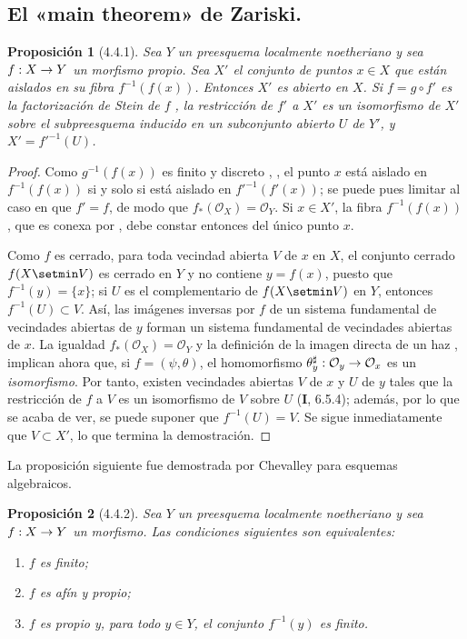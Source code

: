 \documentclass[10pt,oneside,openany]{book}
\theoremstyle{egaenv}\newtheorem*{env}{---}
\theoremstyle{egastatement}
\newtheorem*{proposition}{Proposición}
\theoremstyle{egadescription}
\newcommand{\oldpage}[2][]{\marginnote{\normalfont\scriptsize\textbf{#1}\,|\,#2}\ignorespaces}
\renewcommand{\to}{\mathchoice{\longrightarrow}{\rightarrow}{\rightarrow}{\rightarrow}}
\begin{document}
\subsection{El «main theorem» de Zariski.}
\label{subsection:III.4.4-fr}

\begin{proposition}[4.4.1]
\label{III.4.4.1}
\label{III.4.4.1-fr}
Sea $Y$ un preesquema localmente noetheriano y sea $f:X\to Y$ un
morfismo propio. Sea $X'$ el conjunto de puntos $x\in X$ que están
aislados en su fibra $f^{-1}(f(x))$. Entonces $X'$ es abierto en $X$.
Si
$f=g\circ f'$
es la factorización de Stein de $f$ , la restricción
de $f'$ a $X'$ es un isomorfismo de $X'$ sobre el subpreesquema inducido
en un subconjunto abierto $U$ de $Y'$, y
$X'=f'^{-1}(U)$.
\end{proposition}

\begin{proof}
Como $g^{-1}(f(x))$ es finito y discreto
, , el punto $x$ está aislado en
$f^{-1}(f(x))$ si y solo si está aislado en
$f'^{-1}(f'(x))$; se puede pues limitar al caso en que $f'=f$, de
modo que $f_*(\mathcal O_X)=\mathcal O_Y$. Si $x\in X'$, la fibra
$f^{-1}(f(x))$, que es conexa por , debe constar
entonces del único punto $x$.

Como $f$ es cerrado, para toda vecindad abierta $V$ de $x$ en $X$, el
conjunto cerrado $f(X\setmin V)$ es cerrado en $Y$ y no contiene
$y=f(x)$, puesto que $f^{-1}(y)=\{x\}$; si $U$ es el complementario de
$f(X\setmin V)$ en $Y$, entonces $f^{-1}(U)\subset V$. Así, las
imágenes inversas por $f$ de un sistema fundamental de vecindades
abiertas de $y$ forman un sistema fundamental de vecindades abiertas de
$x$. La igualdad $f_*(\mathcal O_X)=\mathcal O_Y$ y la definición de la
imagen directa de un haz ,  implican
ahora que, si $f=(\psi,\theta)$, el homomorfismo
$\theta_y^\sharp:\mathcal O_y\to\mathcal O_x$
es un \emph{isomorfismo}. Por tanto, existen vecindades abiertas $V$ de $x$ y
$U$ de $y$ tales que la restricción de $f$ a $V$ es un isomorfismo de $V$ sobre
$U$ (\textbf{I}, 6.5.4); además, por lo que se acaba de ver,
\oldpage[III]{136}
se puede suponer que $f^{-1}(U)=V$. Se sigue inmediatamente que $V\subset X'$, lo que
termina la demostración.
\end{proof}

La proposición siguiente fue demostrada por Chevalley para esquemas
algebraicos.

\begin{proposition}[4.4.2]
\label{III.4.4.2}
\label{III.4.4.2-fr}
Sea $Y$ un preesquema localmente noetheriano y sea $f:X\to Y$ un
morfismo. Las condiciones siguientes son equivalentes:
\begin{enumerate}
  \item[{\rm a)}] $f$ es finito;
  \item[{\rm b)}] $f$ es afín y propio;
  \item[{\rm c)}] $f$ es propio y, para todo $y\in Y$, el conjunto
    $f^{-1}(y)$ es finito.
\end{enumerate}
\end{proposition}
\end{document}
